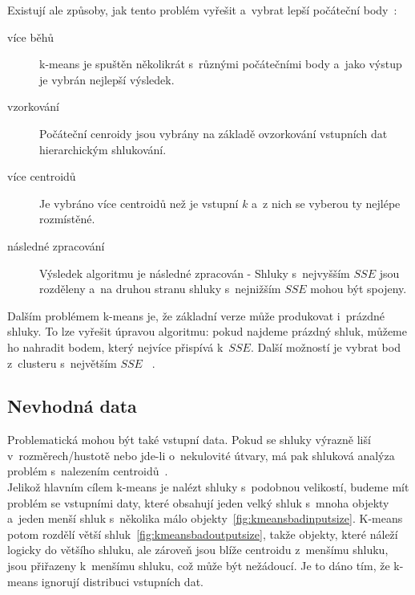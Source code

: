 Existují ale způsoby, jak tento problém vyřešit a~vybrat lepší počáteční body~\cite{Tan05}:
\begin{description}
\item[více běhů] k-means je spuštěn několikrát s~různými počátečními body a~jako výstup je vybrán nejlepší výsledek.
\item[vzorkování] Počáteční cenroidy jsou vybrány na základě ovzorkování vstupních dat hierarchickým shlukování.
\item[více centroidů] Je vybráno více centroidů než je vstupní $k$ a~z nich se vyberou ty nejlépe rozmístěné.
\item[následné zpracování] Výsledek algoritmu je následné zpracován - Shluky s~nej\-vyš\-ším $SSE$ jsou rozděleny a~na druhou stranu shluky s~nejnižším $SSE$ mohou být spojeny.
\end{description} 

Dalším problémem k-means je, že základní verze může produkovat i~prázdné shluky. To lze vyřešit úpravou algoritmu: pokud najdeme prázdný shluk, můžeme ho nahradit bodem, který nejvíce přispívá k~$SSE$. Další možností je vybrat bod z~clusteru s~největším $SSE$ ~\cite{Tan05}.\\

\subsection{Nevhodná data}
Problematická mohou být také vstupní data. Pokud se shluky výrazně liší v~rozměrech/hustotě nebo jde-li o~nekulovité útvary, má pak shluková analýza problém s~nalezením centroidů~\cite{Tan05}. \\

Jelikož hlavním cílem k-means je nalézt shluky s~podobnou velikostí, budeme mít problém se vstupními daty, které obsahují jeden velký shluk s~mnoha objekty a~jeden menší shluk s~několika málo objekty~\autoref{fig:kmeansbadinputsize}. K-means potom rozdělí větší shluk~\autoref{fig:kmeansbadoutputsize}, takže objekty, které náleží logicky do většího shluku, ale zároveň jsou blíže centroidu z~menšímu shluku, jsou přiřazeny k~menšímu shluku, což může být nežádoucí. Je to dáno tím, že k-means ignorují distribuci vstupních dat.

